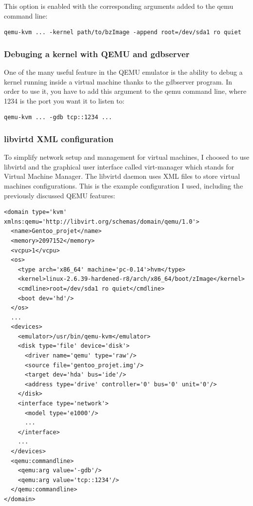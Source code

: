 \documentclass[pdftex,a4paper,titlepage,11pt]{article}
\begin{document}
This option is enabled with the corresponding arguments added to the qemu
command line:

\begin{lstlisting}
qemu-kvm ... -kernel path/to/bzImage -append root=/dev/sda1 ro quiet
\end{lstlisting}

\subsubsection{Debuging a kernel with QEMU and gdbserver}

One of the many useful feature in the QEMU emulator is the ability to debug a
kernel running inside a virtual machine thanks to the gdbserver program. In
order to use it, you have to add this argument to the qemu command line, where
1234 is the port you want it to listen to:

\begin{lstlisting}
qemu-kvm ... -gdb tcp::1234 ...
\end{lstlisting}

\subsubsection{libvirtd XML configuration}

To simplify network setup and management for virtual machines, I choosed to
use libvirtd and the graphical user interface called virt-manager which
stands for Virtual Machine Manager. The libvirtd daemon uses XML files to
store virtual machines configurations. This is the example configuration I used,
including the previously discussed QEMU features:

\begin{lstlisting}
<domain type='kvm' xmlns:qemu='http://libvirt.org/schemas/domain/qemu/1.0'>
  <name>Gentoo_projet</name>
  <memory>2097152</memory>
  <vcpu>1</vcpu>
  <os>
    <type arch='x86_64' machine='pc-0.14'>hvm</type>
    <kernel>linux-2.6.39-hardened-r8/arch/x86_64/boot/zImage</kernel>
    <cmdline>root=/dev/sda1 ro quiet</cmdline>
    <boot dev='hd'/>
  </os>
  ...
  <devices>
    <emulator>/usr/bin/qemu-kvm</emulator>
    <disk type='file' device='disk'>
      <driver name='qemu' type='raw'/>
      <source file='gentoo_projet.img'/>
      <target dev='hda' bus='ide'/>
      <address type='drive' controller='0' bus='0' unit='0'/>
    </disk>
    <interface type='network'>
      <model type='e1000'/>
      ...
    </interface>
    ...
  </devices>
  <qemu:commandline>
    <qemu:arg value='-gdb'/>
    <qemu:arg value='tcp::1234'/>
  </qemu:commandline>
</domain>
\end{lstlisting}
\end{document}

